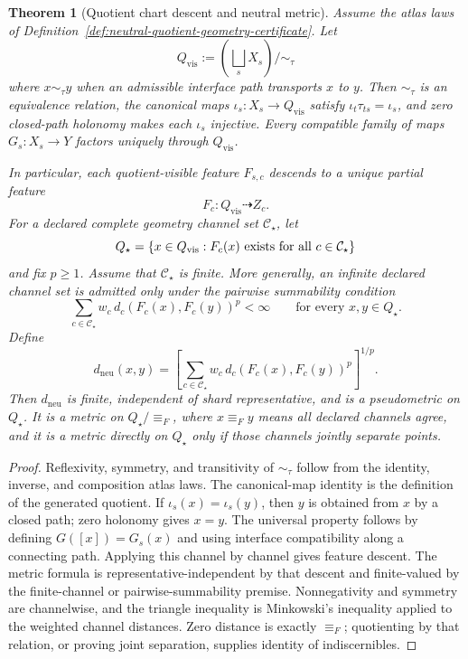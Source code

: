 \documentclass[11pt]{article}
\newtheorem{theorem}{Theorem}[section]
\begin{document}
\begin{theorem}[Quotient chart descent and neutral metric]\label{thm:neutral-quotient-metric}
Assume the atlas laws of Definition~\ref{def:neutral-quotient-geometry-certificate}. Let
\[
Q_{\mathrm{vis}}
:=
\left(\bigsqcup_s X_s\right)\big/\sim_\tau
\]
where \(x\sim_\tau y\) when an admissible interface path transports \(x\) to \(y\). Then
\(\sim_\tau\) is an equivalence relation, the canonical maps
\(\iota_s:X_s\to Q_{\mathrm{vis}}\) satisfy
\(\iota_t\tau_{ts}=\iota_s\), and zero closed-path holonomy makes each \(\iota_s\) injective.
Every compatible family of maps \(G_s:X_s\to Y\) factors uniquely through
\(Q_{\mathrm{vis}}\).

In particular, each quotient-visible feature \(F_{s,c}\) descends to a unique partial feature
\[
F_c:Q_{\mathrm{vis}}\dashrightarrow Z_c .
\]
For a declared complete geometry channel set \(\mathcal C_\star\), let
\[
Q_\star=\{x\in Q_{\mathrm{vis}}:F_c(x)\ \hbox{exists for all }c\in\mathcal C_\star\}
\]
and fix \(p\ge 1\). Assume that \(\mathcal C_\star\) is finite. More
generally, an infinite declared channel set is admitted only under the
pairwise summability condition
\[
\sum_{c\in\mathcal C_\star}
w_c\,d_c(F_c(x),F_c(y))^p<\infty
\qquad\text{for every }x,y\in Q_\star.
\]
Define
\[
d_{\mathrm{neu}}(x,y)
=
\left[
\sum_{c\in\mathcal C_\star}
w_c\,d_c(F_c(x),F_c(y))^p
\right]^{1/p}.
\]
Then \(d_{\mathrm{neu}}\) is finite, independent of shard representative, and
is a pseudometric on \(Q_\star\). It is a metric on
\(Q_\star/\!\equiv_F\), where \(x\equiv_F y\) means all declared
channels agree, and it is a metric directly on \(Q_\star\) only if those channels jointly
separate points.
\end{theorem}

\begin{proof}
Reflexivity, symmetry, and transitivity of \(\sim_\tau\) follow from the identity, inverse, and
composition atlas laws. The canonical-map identity is the definition of the generated quotient.
If \(\iota_s(x)=\iota_s(y)\), then \(y\) is obtained from \(x\) by a closed path; zero holonomy
gives \(x=y\). The universal property follows by defining \(G([x])=G_s(x)\) and using interface
compatibility along a connecting path. Applying this channel by channel gives feature descent.
The metric formula is representative-independent by that descent and
finite-valued by the finite-channel or pairwise-summability premise.
Nonnegativity and symmetry are channelwise, and the triangle inequality is
Minkowski's inequality applied to the weighted channel distances.
Zero distance is exactly \(\equiv_F\); quotienting by that relation, or proving joint separation,
supplies identity of indiscernibles.
\end{proof}
\end{document}
